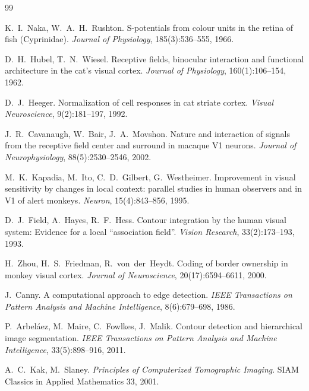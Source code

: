\documentclass[11pt,a4paper]{article}
\begin{document}
\begin{thebibliography}{99}

K.~I.~Naka, W.~A.~H.~Rushton.
\newblock S-potentials from colour units in the retina of fish (Cyprinidae).
\newblock \emph{Journal of Physiology}, 185(3):536--555, 1966.

D.~H.~Hubel, T.~N.~Wiesel.
\newblock Receptive fields, binocular interaction and functional architecture in the cat's visual cortex.
\newblock \emph{Journal of Physiology}, 160(1):106--154, 1962.

D.~J.~Heeger.
\newblock Normalization of cell responses in cat striate cortex.
\newblock \emph{Visual Neuroscience}, 9(2):181--197, 1992.

J.~R.~Cavanaugh, W.~Bair, J.~A.~Movshon.
\newblock Nature and interaction of signals from the receptive field center and surround in macaque V1 neurons.
\newblock \emph{Journal of Neurophysiology}, 88(5):2530--2546, 2002.

M.~K.~Kapadia, M.~Ito, C.~D.~Gilbert, G.~Westheimer.
\newblock Improvement in visual sensitivity by changes in local context: parallel studies in human observers and in V1 of alert monkeys.
\newblock \emph{Neuron}, 15(4):843--856, 1995.

D.~J.~Field, A.~Hayes, R.~F.~Hess.
\newblock Contour integration by the human visual system: Evidence for a local ``association field''.
\newblock \emph{Vision Research}, 33(2):173--193, 1993.

H.~Zhou, H.~S.~Friedman, R.~von~der~Heydt.
\newblock Coding of border ownership in monkey visual cortex.
\newblock \emph{Journal of Neuroscience}, 20(17):6594--6611, 2000.

J.~Canny.
\newblock A computational approach to edge detection.
\newblock \emph{IEEE Transactions on Pattern Analysis and Machine Intelligence}, 8(6):679--698, 1986.

P.~Arbeláez, M.~Maire, C.~Fowlkes, J.~Malik.
\newblock Contour detection and hierarchical image segmentation.
\newblock \emph{IEEE Transactions on Pattern Analysis and Machine Intelligence}, 33(5):898--916, 2011.

A.~C.~Kak, M.~Slaney.
\newblock \emph{Principles of Computerized Tomographic Imaging}.
\newblock SIAM Classics in Applied Mathematics 33, 2001.


\end{thebibliography}
\end{document}
